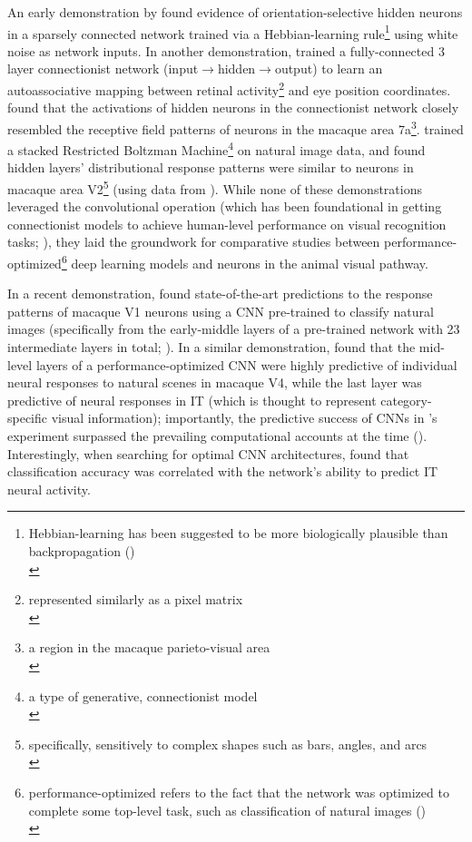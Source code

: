 \documentclass[12pt]{article}
\let\oldcite=\cite
\let\oldtextcite=\textcite
\renewcommand{\cite}[1]{\textcolor[rgb]{0, .121, .388}{\oldcite{#1}}}
\renewcommand{\textcite}[1]{\textcolor[rgb]{0, .121, .388}{\oldtextcite{#1}}}
\begin{document}
An early demonstration by \textcite{linsker1988self} found evidence of orientation-selective hidden neurons in a sparsely connected network trained via a Hebbian-learning rule\footnote{Hebbian-learning has been suggested to be more biologically plausible than backpropagation (\cite{mazzoni1991more,xie2003equivalence}) \\} using white noise as network inputs. In another demonstration, \textcite{zipser1988back} trained a fully-connected 3 layer connectionist network (input\(\rightarrow\)hidden\(\rightarrow\)output) to learn an autoassociative mapping between retinal activity\footnote{represented similarly as a pixel matrix \\} and eye position coordinates. \textcite{zipser1988back} found that the activations of hidden neurons in the connectionist network closely resembled the receptive field patterns of neurons in the macaque area 7a\footnote{a region in the macaque parieto-visual area \\}. \textcite{lee2008sparse} trained a stacked Restricted Boltzman Machine\footnote{a type of generative, connectionist model \\} on natural image data, and found hidden layers' distributional response patterns were similar to neurons in macaque area V2\footnote{specifically, sensitively to complex shapes such as bars, angles, and arcs \\} (using data from \cite{ito2004representation}). While none of these demonstrations leveraged the convolutional operation (which has been foundational in getting connectionist models to achieve human-level performance on visual recognition tasks; \cite{he2015delving}), they laid the groundwork for comparative studies between performance-optimized\footnote{performance-optimized refers to the fact that the network was optimized to complete some top-level task, such as classification of natural images (\cite{yamins2014performance}) \\} deep learning models and neurons in the animal visual pathway.

In a recent demonstration, \textcite{cadena2019deep} found state-of-the-art predictions to the response patterns of macaque V1 neurons using a CNN pre-trained to classify natural images (specifically from the early-middle layers of a pre-trained network with 23 intermediate layers in total; \cite{simonyan2014very}). In a similar demonstration, \textcite{yamins2014performance} found that the mid-level layers of a performance-optimized CNN were highly predictive of individual neural responses to natural scenes in macaque V4, while the last layer was predictive of neural responses in IT (which is thought to represent category-specific visual information); importantly, the predictive success of CNNs in \textcite{yamins2014performance}'s experiment surpassed the prevailing computational accounts at the time (\cite{lowe2004distinctive,serre2007feedforward}). Interestingly, when searching for optimal CNN architectures, \textcite{yamins2014performance} found that classification accuracy was correlated with the network's ability to predict IT neural activity.
\end{document}
